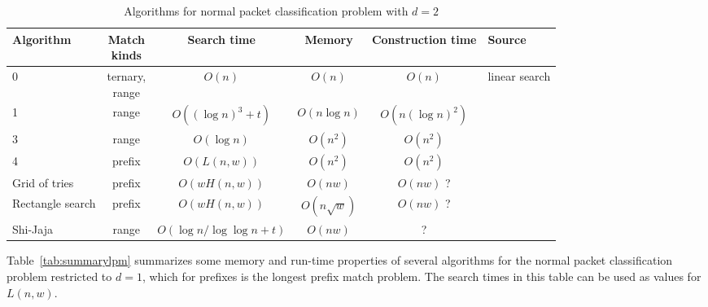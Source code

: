 \documentclass[acmsmall]{acmart}
\begin{document}
\begin{table*}
  \caption{Algorithms for normal packet classification problem with $d=2$}
  \label{tab:summary2}
  \begin{tabular}{lccccl}
    \toprule

      Algorithm
    & \makecell{Match \\ kinds}
    & Search time
    & Memory
    & Construction time
    & Source \\

    \midrule

      0
    & \makecell{ternary, \\ range}
    & $O(n)$
    & $O(n)$
    & $O(n)$
    & linear search
    \\

      1
    & range
    & $O((\log n)^3 + t)$
    & $O(n \log n )$
    & $O(n (\log n)^2 )$
    & \cite[Thm. 3.2]{Edel1983a}
    \\

      3
    & range
    & $O(\log n)$
    & $O(n^2)$
    & $O(n^2)$
    & \cite[Sec. 2.3]{PS1985}
    \\

      4
    & prefix
    & $O(L(n,w))$
    & $O(n^2)$
    & $O(n^2)$
    & \cite[Sec. 2.3]{PS1985}
    \\

      Grid of tries
    & prefix
    & $O(w H(n,w))$
    & $O(nw)$
    & $O(nw)$ ?
    & \cite{SVSW1998}
    \\

      Rectangle search
    & prefix\footnotemark{}
    & $O(w H(n,w))$
    & $O(n \sqrt{w})$
    & $O(nw)$ ?
    & \cite[Sec. 8]{SSV1999}
    \\

      Shi-Jaja\footnotemark{}
    & range
    & $O(\log n / \log \log n + t)$
    & $O(nw)$
    & ?
    & \cite[Sec. 5]{SJ2005}
    \\

  \bottomrule
\end{tabular}
\end{table*}


Table~\ref{tab:summarylpm} summarizes some memory and run-time properties of several algorithms for the normal packet classification problem restricted to $d=1$, which for
prefixes is the longest prefix match problem.
The search times in this table can be used as values for $L(n,w)$.
\end{document}
